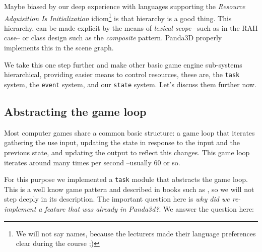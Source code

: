 \documentclass[a4paper,10pt]{article}
\begin{document}
Maybe biased by our deep experience with languages supporting the
\emph{Resource Adquisition Is Initialization} idiom\footnote{We will
  not say names, because the lecturers made their language preferences
  clear during the course ;)} is that hierarchy is a good thing. This
hierarchy, can be made explicit by the means of \emph{lexical scope}
--such as in the RAII case-- or class design such as the
\emph{composite}\cite{gof} pattern. Panda3D properly implements this
in the scene graph. 

We take this one step further and make other basic game engine
sub-systems hierarchical, providing easier means to control
resources, these are, the \texttt{task} system, the \texttt{event}
system, and our \texttt{state} system. Let's discuss them further now.

\subsection{Abstracting the game loop}

Most computer games share a common basic structure: a game loop that
iterates gathering the use input, updating the state in response to
the input and the previous state, and updating the output to reflect
this changes. This game loop iterates around many times per second
--usually 60 or so.

For this purpose we implemented a \texttt{task} module that abstracts
the game loop. This is a well know game pattern and described in books
such as \cite{game-coding}, so we will not step deeply in its
description. The important question here is \emph{why did we
  re-implement a feature that was already in Panda3d?}. We answer the
question here:
\end{document}
